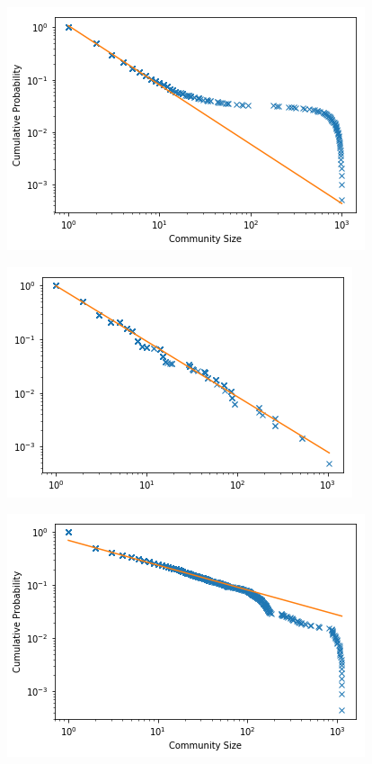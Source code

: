 \documentclass[12pt,twoside]{report}
\begin{document}
\begin{center}
\begin{minipage}{0.45\linewidth}
\includegraphics[width=\linewidth]{figures/er_curve.png}
\end{minipage}%
\hfill
\begin{minipage}{0.45\linewidth}
\includegraphics[width=\linewidth]{figures/fractal_curve.png}
\end{minipage}%
\hfill
\begin{minipage}{0.45\linewidth}
\includegraphics[width=\linewidth]{figures/uvl_curve.png}

\end{minipage}
\end{center}
\end{document}
